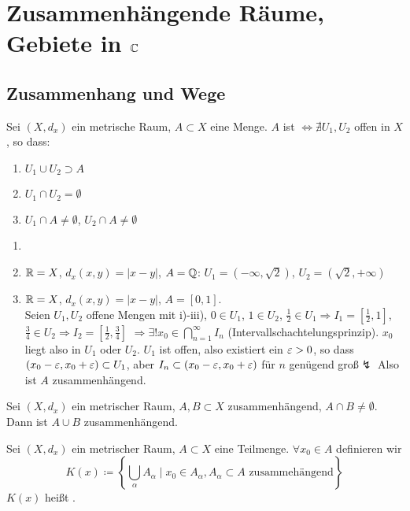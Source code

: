 \chapter[Zusammenh\"angende R\"aume, Gebiete in $ \C $]{Zusammenh\"angende R\"aume,\\Gebiete in $ \C $}
\section*{Zusammenhang und Wege}
\begin{definition}
Sei $ (X, d_x) $ ein metrische Raum, $ A\subset X $ eine Menge. $ A $ ist $ \Leftrightarrow\nexists U_1,U_2 $ offen in $ X $, so dass:
\begin{enumerate}
\item $ U_1\cup U_2\supset A $
\item $ U_1\cap U_2=\emptyset $
\item $ U_1\cap A\neq\emptyset $, $ U_2\cap A\neq\emptyset $
\end{enumerate}
\end{definition}
\begin{beispiel*}
\begin{enumerate}
\item[]
\item $ \mathbb{R}=X $, $ d_x(x,y)=|x-y| $, $ A=\mathbb{Q} $: $ U_1=(-\infty,\sqrt{2}) $, $ U_2=(\sqrt{2},+\infty) $
\item $ \mathbb{R}=X $, $ d_x(x,y)=|x-y| $, $ A=[0,1] $.\\
Seien $ U_1,U_2 $ offene Mengen mit i)-iii), $ 0\in U_1 $, $ 1\in U_2 $, $ \frac{1}{2}\in U_1 \Rightarrow I_1=\left[\frac{1}{2},1\right]$, $ \frac{3}{4}\in U_2\Rightarrow I_2=\left[\frac{1}{2},\frac{3}{4}\right]$ $\Rightarrow\exists! x_0\in\bigcap_{n=1}^\infty I_n $ (Intervallschachtelungsprinzip). $ x_0 $ liegt also in $ U_1 $ oder $ U_2 $. $ U_1 $ ist offen, also existiert ein $ \varepsilon>0 $, so dass $ (x_0-\varepsilon,x_0+\varepsilon)\subset U_1 $, aber $ I_n\subset(x_0-\varepsilon,x_0+\varepsilon) $ f\"ur $ n $ gen\"ugend gro\ss $\lightning $ Also ist $ A $ zusammenh\"angend.
\end{enumerate} 
\end{beispiel*}
\begin{bemerkung*}
Sei $ (X,d_x) $ ein metrischer Raum, $ A,B\subset X $ zusammenh\"angend, $ A\cap B\neq\emptyset $. Dann ist $ A\cup B $ zusammenh\"angend.
\end{bemerkung*}
\begin{definition}
Sei $ (X,d_x) $ ein metrischer Raum, $ A\subset X $ eine Teilmenge. $ \forall x_0\in A $ definieren wir \[ K(x)\coloneqq\left\lbrace\bigcup_\alpha A_\alpha\mid x_0\in A_\alpha, A_\alpha\subset A\text{ zusammeh\"angend} \right\rbrace \]
$ K(x) $ hei\ss t .
\end{definition}
